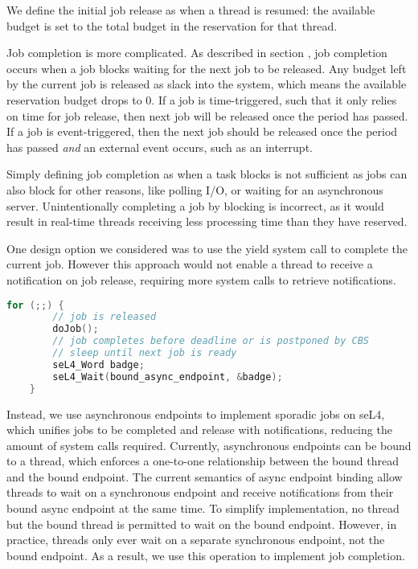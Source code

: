 We define the initial job release as when a thread is resumed: the available budget is set to the total budget in the reservation for that thread.

Job completion is more complicated.
As described in section , job completion occurs when a job blocks waiting for the next job to be released.
Any budget left by the current job is released as slack into the system, which means the available reservation budget drops to 0.
If a job is time-triggered, such that it only relies on time for job release, then next job will be released once the period has passed.
If a job is event-triggered, then the next job should be released once the period has passed \textit{and} an external event occurs, such as an interrupt.

Simply defining job completion as when a task blocks is not sufficient as jobs can also block for other reasons, like polling I/O, or waiting for an asynchronous server.
Unintentionally completing a job by blocking is incorrect, as it would result in real-time threads receiving less processing time than they have reserved.

One design option we considered was to use the yield system call to complete the current job.
However this approach would not enable a thread to receive a notification on job release, requiring more system calls to retrieve notifications.

\begin{lstlisting}[frame=single,language=c,caption=Example of a basic sporadic real-time task on sel4.,    label=list:sporadic-sel4]
    for (;;) {
        // job is released
        doJob();
        // job completes before deadline or is postponed by CBS
        // sleep until next job is ready
        seL4_Word badge;
        seL4_Wait(bound_async_endpoint, &badge);
    }
\end{lstlisting}

Instead, we use asynchronous endpoints to implement sporadic jobs on seL4, which unifies jobs to be completed and release with notifications, reducing the amount of system calls required.
Currently, asynchronous endpoints can be bound to a thread, which enforces a one-to-one relationship between the bound thread and the bound endpoint.
The current semantics of async endpoint binding allow threads to wait on a synchronous endpoint and receive notifications from their bound async endpoint at the same time.
To simplify implementation, no thread but the bound thread is permitted to wait on the bound endpoint.
However, in practice, threads only ever wait on a separate synchronous endpoint, not the bound endpoint.
As a result, we use this operation to implement job completion.

